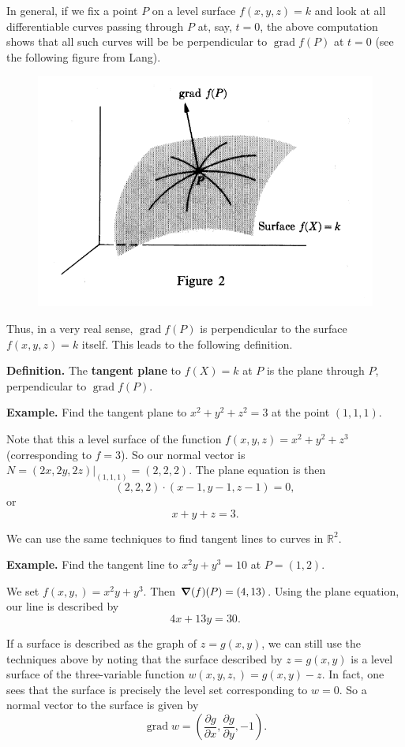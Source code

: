 \documentclass{article}
\DeclareMathOperator{\grd}{grad}
\begin{document}
In general, if we fix a point $P$ on a level surface $f(x,y,z)=k$ and look at all
differentiable curves passing through $P$ at, say, $t=0$, the above computation shows that all such curves
will be be perpendicular to $\grd{f}(P)$ at $t=0$ (see the following figure from Lang).
\begin{figure}[h]
    \centering
    \includegraphics[scale = 0.5]{tangent1.PNG}
\end{figure}
Thus, in a very real sense, $\grd f(P)$ is perpendicular to the surface $f(x,y,z)=k$ itself.
This leads to the following definition.

\textbf{Definition.} The \textbf{tangent plane} to $f(X)=k$ at $P$ is the plane through $P$,
perpendicular to $\grd f(P)$.

\textbf{Example.} Find the tangent plane to $x^2+y^2+z^2=3$ at the point $(1,1,1)$. 

Note that this a level surface of the function $f(x,y,z)=x^2+y^2+z^3$ (corresponding to $f=3$). 
So our normal vector is $N = (2x,2y,2z)|_{(1,1,1)} = (2,2,2)$. The plane equation is then
\[(2,2,2)\cdot(x-1,y-1,z-1)=0,\]
or
\[x+y+z=3.\] 

We can use the same techniques to find tangent lines to curves in $\mathbb{R}^2$.

\textbf{Example.} Find the tangent line to $x^2y + y^3 = 10$ at $P=(1,2)$.

We set $f(x,y,)=x^2y+y^3$. Then $\grad(f)(P)=(4,13)$. Using the plane equation, our line is described by 
\[4x+13y=30.\]

If a surface is described as the graph of $z=g(x,y)$, we can still use the techniques above by noting
that the surface described by $z=g(x,y)$ is a level surface of the three-variable function $w(x,y,z,)=g(x,y)-z$.
In fact, one sees that the surface is precisely the level set corresponding to $w=0$. So a normal vector
to the surface is given by
 \[\grd w = \left(\frac{\partial g}{\partial x}, \frac{\partial g}{\partial y},-1\right).\]
\end{document}
